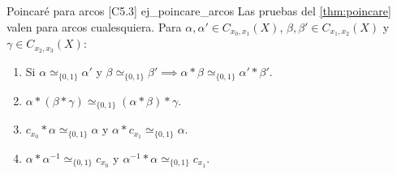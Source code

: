 \begin{proposicion}{Poincaré para arcos [C5.3] \marcaE}{ej_poincare_arcos}
Las pruebas del \cref{thm:poincare} valen para arcos cualesquiera. Para $\alpha, \alpha' \in C_{x_0,x_1}(X)$, $\beta, \beta' \in C_{x_1,x_2}(X)$ y $\gamma \in C_{x_2,x_3}(X)$:
\begin{enumerate}
    \item[a)] Si $\alpha \simeq_{\{0,1\}} \alpha'$ y $\beta \simeq_{\{0,1\}} \beta' \implies \alpha * \beta \simeq_{\{0,1\}} \alpha' * \beta'$.
    \item[b)] $\alpha * (\beta * \gamma) \simeq_{\{0,1\}} (\alpha * \beta) * \gamma$.
    \item[c)] $c_{x_0} * \alpha \simeq_{\{0,1\}} \alpha$ y $\alpha * c_{x_1} \simeq_{\{0,1\}} \alpha$.
    \item[d)] $\alpha * \alpha^{-1} \simeq_{\{0,1\}} c_{x_0}$ y $\alpha^{-1} * \alpha \simeq_{\{0,1\}} c_{x_1}$.
\end{enumerate}
\end{proposicion}

